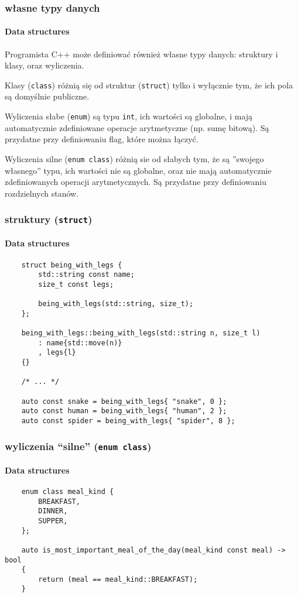 \documentclass[aspectratio=169]{beamer}
\begin{document}
\begin{frame}
    \frametitle{własne typy danych}
    \framesubtitle{Data structures}

    Programista C++ może definiować również własne typy danych: struktury i
    klasy, oraz wyliczenia.

    \vspace{1em}

    Klasy ({\tt class}) różnią się od struktur ({\tt struct}) tylko i wyłącznie
    tym, że ich pola są domyślnie publiczne.

    \vspace{1em}

    Wyliczenia słabe ({\tt enum}) są typu {\tt int}, ich wartości są globalne, i
    mają automatycznie zdefiniowane operacje arytmetyczne (np. sumę bitową). Są
    przydatne przy definiowaniu flag, które można łączyć.

    Wyliczenia silne ({\tt enum class}) różnią sie od słabych tym, że są
    ''swojego własnego'' typu, ich wartości nie są globalne, oraz nie mają
    automatycznie zdefiniowanych operacji arytmetycznych. Są przydatne przy
    definiowaniu rozdzielnych stanów.
\end{frame}

\begin{frame}[fragile]
    \frametitle{struktury ({\tt struct})}
    \framesubtitle{Data structures}

    {\scriptsize
    \begin{lstlisting}
    struct being_with_legs {
        std::string const name;
        size_t const legs;

        being_with_legs(std::string, size_t);
    };

    being_with_legs::being_with_legs(std::string n, size_t l)
        : name{std::move(n)}
        , legs{l}
    {}

    /* ... */

    auto const snake = being_with_legs{ "snake", 0 };
    auto const human = being_with_legs{ "human", 2 };
    auto const spider = being_with_legs{ "spider", 8 };
    \end{lstlisting}}
\end{frame}

\begin{frame}[fragile]
    \frametitle{wyliczenia ``silne'' ({\tt enum class})}
    \framesubtitle{Data structures}

    {\scriptsize
    \begin{lstlisting}
    enum class meal_kind {
        BREAKFAST,
        DINNER,
        SUPPER,
    };

    auto is_most_important_meal_of_the_day(meal_kind const meal) -> bool
    {
        return (meal == meal_kind::BREAKFAST);
    }
    \end{lstlisting}}
\end{frame}
\end{document}
